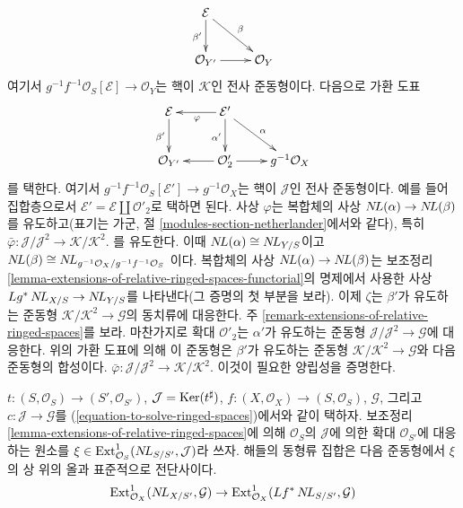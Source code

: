 \begin{remark}
$$
\xymatrix{
\mathcal{E} \ar[d]_{\beta'} \ar[rd]^\beta \\
\mathcal{O}_{Y'} \ar[r] & \mathcal{O}_Y
}
$$
여기서 $g^{-1}f^{-1}\mathcal{O}_S[\mathcal{E}] \to \mathcal{O}_Y$는
핵이 $\mathcal{K}$인 전사 준동형이다. 다음으로 가환 도표
$$
\xymatrix{
\mathcal{E} \ar[d]_{\beta'} &
\mathcal{E}' \ar[l]^\varphi \ar[d]_{\alpha'} \ar[rd]^\alpha \\
\mathcal{O}_{Y'} &
\mathcal{O}'_2 \ar[l] \ar[r] &
g^{-1}\mathcal{O}_X
}
$$
를 택한다. 여기서
$g^{-1}f^{-1}\mathcal{O}_S[\mathcal{E}'] \to g^{-1}\mathcal{O}_X$는
핵이 $\mathcal{J}$인 전사 준동형이다. 예를 들어 집합층으로서
$\mathcal{E}' = \mathcal{E} \amalg \mathcal{O}'_2$로 택하면 된다.
사상 $\varphi$는 복합체의 사상 $\mathop{N\!L}\nolimits(\alpha) \to \mathop{N\!L}\nolimits(\beta)$를
유도하고(표기는 가군, 절 \ref{modules-section-netherlander}에서와
같다), 특히
$\bar\varphi : \mathcal{J}/\mathcal{J}^2 \to \mathcal{K}/\mathcal{K}^2$.
를 유도한다. 이때 $\mathop{N\!L}\nolimits(\alpha) \cong \mathop{N\!L}\nolimits_{Y/S}$이고
$\mathop{N\!L}\nolimits(\beta) \cong \mathop{N\!L}\nolimits_{g^{-1}\mathcal{O}_X/g^{-1}f^{-1}\mathcal{O}_S}$
이다. 복합체의 사상 $\mathop{N\!L}\nolimits(\alpha) \to \mathop{N\!L}\nolimits(\beta)$는 보조정리
\ref{lemma-extensions-of-relative-ringed-spaces-functorial}의 명제에서
사용한 사상 $Lg^*\mathop{N\!L}\nolimits_{X/S} \to \mathop{N\!L}\nolimits_{Y/S}$를 나타낸다(그 증명의 첫
부분을 보라). 이제 $\zeta$는 $\beta'$가 유도하는 준동형
$\mathcal{K}/\mathcal{K}^2 \to \mathcal{G}$의 동치류에 대응한다.
주 \ref{remark-extensions-of-relative-ringed-spaces}를 보라. 마찬가지로
확대 $\mathcal{O}'_2$는 $\alpha'$가 유도하는 준동형
$\mathcal{J}/\mathcal{J}^2 \to \mathcal{G}$에 대응한다. 위의 가환
도표에 의해 이 준동형은 $\beta'$가 유도하는 준동형
$\mathcal{K}/\mathcal{K}^2 \to \mathcal{G}$와 다음 준동형의 합성이다.
$\bar\varphi : \mathcal{J}/\mathcal{J}^2 \to \mathcal{K}/\mathcal{K}^2$.
이것이 필요한 양립성을 증명한다.
\end{remark}

\begin{lemma}
\label{lemma-parametrize-solutions-ringed-spaces}
$t : (S, \mathcal{O}_S) \to (S', \mathcal{O}_{S'})$,
$\mathcal{J} = \mathop{\mathrm{Ker}}(t^\sharp)$,
$f : (X, \mathcal{O}_X) \to (S, \mathcal{O}_S)$, $\mathcal{G}$,
그리고 $c : \mathcal{J} \to \mathcal{G}$를
(\ref{equation-to-solve-ringed-spaces})에서와 같이 택하자. 보조정리
\ref{lemma-extensions-of-relative-ringed-spaces}에 의해
$\mathcal{O}_S$의 $\mathcal{J}$에 의한 확대 $\mathcal{O}_{S'}$에
대응하는 원소를
$\xi \in \mathop{\mathrm{Ext}}\nolimits^1_{\mathcal{O}_S}(\mathop{N\!L}\nolimits_{S/S'}, \mathcal{J})$라 쓰자.
해들의 동형류 집합은 다음 준동형에서 $\xi$의 상 위의 올과
표준적으로 전단사이다.
$$
\mathop{\mathrm{Ext}}\nolimits^1_{\mathcal{O}_X}(\mathop{N\!L}\nolimits_{X/S'}, \mathcal{G}) \to
\mathop{\mathrm{Ext}}\nolimits^1_{\mathcal{O}_X}(Lf^*\mathop{N\!L}\nolimits_{S/S'}, \mathcal{G})
$$
\end{lemma}

